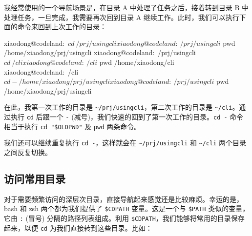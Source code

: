 \documentclass[]{ctexbook}
\newenvironment{Shaded}{\begin{snugshade}}{\end{snugshade}}
\newcommand{\BuiltInTok}[1]{#1}
\newcommand{\ExtensionTok}[1]{#1}
\newcommand{\KeywordTok}[1]{\textcolor[rgb]{0.13,0.29,0.53}{\textbf{#1}}}
\newcommand{\NormalTok}[1]{#1}
\newcommand{\StringTok}[1]{\textcolor[rgb]{0.31,0.60,0.02}{#1}}
\newcommand{\VariableTok}[1]{\textcolor[rgb]{0.00,0.00,0.00}{#1}}
\begin{document}
我经常使用的一个导航场景是，在目录 A 中处理了任务之后，接着转到目录 B 中处理任务，一旦完成，我需要再次回到目录 A 继续工作。此时，我们可以执行下面的命令来回到上次工作的目录：

\begin{Shaded}
\begin{Highlighting}[]
\ExtensionTok{xiaodong@codeland}\NormalTok{:~$ cd ~/prj/usingcli}
\ExtensionTok{xiaodong@codeland}\NormalTok{:~/prj/usingcli$ pwd}
\ExtensionTok{/home/xiaodong/prj/usingcli}
\ExtensionTok{xiaodong@codeland}\NormalTok{:~/prj/usingcli$ cd ~/cli}
\ExtensionTok{xiaodong@codeland}\NormalTok{:~/cli$ pwd}
\ExtensionTok{/home/xiaodong/cli}
\ExtensionTok{xiaodong@codeland}\NormalTok{:~/cli$ cd -}
\ExtensionTok{/home/xiaodong/prj/usingcli}
\ExtensionTok{xiaodong@codeland}\NormalTok{:~/prj/usingcli$ pwd}
\ExtensionTok{/home/xiaodong/prj/usingcli}
\end{Highlighting}
\end{Shaded}

在此，我第一次工作的目录是 \texttt{\textasciitilde{}/prj/usingcli}，第二次工作的目录是 \texttt{\textasciitilde{}/cli}。通过执行 \texttt{cd} 后跟一个 \texttt{-} (减号)，我们快速的回到了第一次工作的目录。\texttt{cd\ -} 命令相当于执行 \texttt{cd\ "\$OLDPWD"} 及 \texttt{pwd} 两条命令。

\begin{Shaded}
\end{Shaded}

我们还可以继续重复执行 \texttt{cd\ -}，这样就会在 \texttt{\textasciitilde{}/prj/usingcli} 和 \texttt{\textasciitilde{}/cli} 两个目录之间反复切换。

\hypertarget{ux8bbfux95eeux5e38ux7528ux76eeux5f55}{%
\subsection{访问常用目录}\label{ux8bbfux95eeux5e38ux7528ux76eeux5f55}}

对于需要频繁访问的深层次目录，直接导航起来感觉还是比较麻烦。幸运的是，bash 和 zsh 两个都为我们提供了 \texttt{\$CDPATH} 变量。这是一个与 \texttt{\$PATH} 类似的变量，它由 \texttt{:} (冒号) 分隔的路径列表组成。利用 \texttt{\$CDPATH}，我们能够将常用的目录保存起来，以便 \texttt{cd} 为我们直接转到这些目录。比如：
\end{document}
